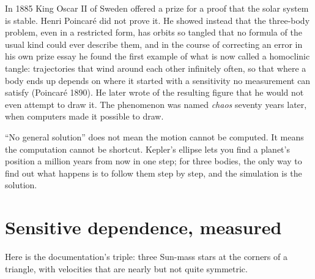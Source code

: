\documentclass[
  10.5pt,
  letterpaper,
]{scrbook}
\theoremstyle{definition}
\theoremstyle{plain}
\theoremstyle{remark}
\begin{document}
\begin{tcolorbox}[enhanced jigsaw, arc=.35mm, bottomrule=.15mm, bottomtitle=1mm, breakable, colback=white, colbacktitle=quarto-callout-note-color!10!white, colframe=quarto-callout-note-color-frame, coltitle=black, left=2mm, leftrule=.75mm, opacityback=0, opacitybacktitle=0.6, rightrule=.15mm, title={Where it comes from}, titlerule=0mm, toprule=.15mm, toptitle=1mm]

In 1885 King Oscar II of Sweden offered a prize for a proof that the
solar system is stable. Henri Poincaré did not prove it. He showed
instead that the three-body problem, even in a restricted form, has
orbits so tangled that no formula of the usual kind could ever describe
them, and in the course of correcting an error in his own prize essay he
found the first example of what is now called a homoclinic tangle:
trajectories that wind around each other infinitely often, so that where
a body ends up depends on where it started with a sensitivity no
measurement can satisfy (Poincaré 1890). He later wrote of the resulting
figure that he would not even attempt to draw it. The phenomenon was
named \emph{chaos} seventy years later, when computers made it possible
to draw.

``No general solution'' does not mean the motion cannot be computed. It
means the computation cannot be shortcut. Kepler's ellipse lets you find
a planet's position a million years from now in one step; for three
bodies, the only way to find out what happens is to follow them step by
step, and the simulation is the solution.

\end{tcolorbox}

\section{Sensitive dependence,
measured}\label{sensitive-dependence-measured}

Here is the documentation's triple: three Sun-mass stars at the corners
of a triangle, with velocities that are nearly but not quite symmetric.
\end{document}
